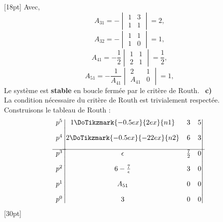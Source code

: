 [18pt]
Avec, 
\[
A_{31}=-\begin{vmatrix}1 & 3 \\1&1\end{vmatrix}=2,
\]
\[
A_{32}=-\begin{vmatrix}1 & 1 \\1&0\end{vmatrix}=1,
\]
\[
A_{41}=-\dfrac{1}{2}\begin{vmatrix}1 & 1 \\2&1\end{vmatrix}=\dfrac{1}{2},
\]
\[
A_{51}=-\dfrac{1}{A_{41}}\begin{vmatrix}2 & 1 \\A_{41}&0\end{vmatrix}=1,
\]
Le système est \textbf{stable} en boucle fermée par le critère de Routh.
\noindent~\textbf{c)}\\
La condition nécessaire du critère de Routh est trivialement respectée.
Construisons le tableau de Routh :
\[
\begin{matrix}
    p^5 \\[1em]
    p^4 \\[1em]
    \hline
    p^3 \\[1em]
    p^2 \\[1em]
    p^1 \\[1em]
    p^0 
\end{matrix}
\begin{vmatrix}
    1\DoTikzmark{-0.5ex}{2ex}{n1}      & 3   & 5 \\[1em]
    2\DoTikzmark{-0.5ex}{-22ex}{n2}      & 6   & 3 \\[1em]
    \hline
    \epsilon   & \frac{7}{2} & 0 \\[1em]
    6-\frac{7}{\epsilon}    & 3  & 0 \\[1em]
    A_{51} & 0  &  0 \\[1em]
    3            & 0  &  0 
\end{vmatrix}
\]
[30pt]
